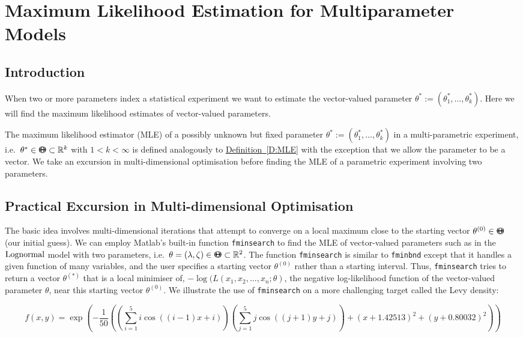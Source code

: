 \chapter{Maximum Likelihood Estimation for Multiparameter Models}\label{S:MultiParamEst}

\section{Introduction}\label{S:MultiParamEstIntro}
When two or more parameters index a statistical experiment we want to estimate the vector-valued parameter $\theta^* := (\theta^*_1,\ldots,\theta^*_k)$.
Here we will find the maximum likelihood estimates of vector-valued parameters.  

The maximum likelihood estimator (MLE) of a possibly unknown but fixed parameter  $\theta^* := (\theta^*_1,\ldots,\theta^*_k)$  in a multi-parametric experiment, i.e.~$\theta^* \in {\Theta}\mspace{-11 mu}{\Theta} \subset \mathbb{R}^k$ with $1 < k < \infty$ is defined analogously to \hyperref[D:LklFn]{Definition~\ref*{D:MLE}} with the exception that we allow the parameter to be a vector.  We take an excursion in multi-dimensional optimisation before finding the MLE of a parametric experiment involving two parameters.

 \section{Practical Excursion in Multi-dimensional Optimisation}\label{S:PracticalMultiDimOptimization}
The basic idea involves multi-dimensional iterations that attempt to converge on a local maximum close to the starting vector $\theta^{(0)} \in {\Theta}\mspace{-11 mu}{\Theta}$ (our initial guess).  We can employ {\sc Matlab}'s built-in function {\tt fminsearch} to find the MLE of vector-valued parameters such as in the $\mbox{{\rm Lognormal}}$ model with two parameters, i.e.~$\theta=(\lambda,\zeta) \in {\Theta}\mspace{-11 mu}{\Theta} \subset \mathbb{R}^2$.  The  function {\tt fminsearch} is similar to {\tt fminbnd} except that it handles a given function of many variables, and the user specifies a starting vector $\theta^{(0)}$ rather than a starting interval.  Thus, {\tt fminsearch} tries to return a vector $\theta^{(*)}$ that is a local minimiser of, $-\log(L(x_1,x_2,\ldots,x_n; \theta)$, the negative log-likelihood function of the vector-valued parameter $\theta$, near this starting vector $\theta^{(0)}$.  
We illustrate the use of {\tt fminsearch} on a more challenging target called the Levy density:

{\scriptsize
\begin{equation}\label{E:LevyDensity}
f(x,y)   =  \exp \left(-\frac{1}{50} \left( \left( \sum_{i=1}^5 {i \cos{((i-1)x+i)} } \right) \left( \sum_{j=1}^5 {j \cos{((j+1)y+j)} } \right)+ (x + 1.42513 )^2 + (y + 0.80032)^2\right) \right)
\end{equation}
}

